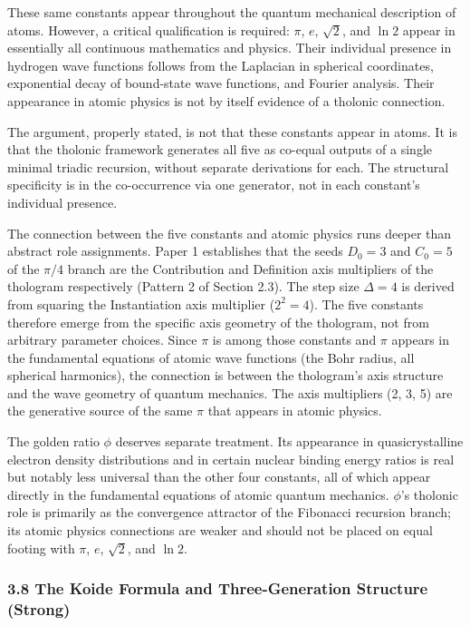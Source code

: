 \documentclass[
  11pt,
  letterpaper,
]{article}
\begin{document}
These same constants appear throughout the quantum mechanical
description of atoms. However, a critical qualification is required:
\(\pi\), \(e\), \(\sqrt{2}\), and \(\ln 2\) appear in essentially all
continuous mathematics and physics. Their individual presence in
hydrogen wave functions follows from the Laplacian in spherical
coordinates, exponential decay of bound-state wave functions, and
Fourier analysis. Their appearance in atomic physics is not by itself
evidence of a tholonic connection.

The argument, properly stated, is not that these constants appear in
atoms. It is that the tholonic framework generates all five as co-equal
outputs of a single minimal triadic recursion, without separate
derivations for each. The structural specificity is in the co-occurrence
via one generator, not in each constant's individual presence.

The connection between the five constants and atomic physics runs deeper
than abstract role assignments. Paper 1 establishes that the seeds
\(D_0 = 3\) and \(C_0 = 5\) of the \(\pi/4\) branch are the Contribution
and Definition axis multipliers of the thologram respectively (Pattern 2
of Section 2.3). The step size \(\Delta = 4\) is derived from squaring
the Instantiation axis multiplier (\(2^2 = 4\)). The five constants
therefore emerge from the specific axis geometry of the thologram, not
from arbitrary parameter choices. Since \(\pi\) is among those constants
and \(\pi\) appears in the fundamental equations of atomic wave
functions (the Bohr radius, all spherical harmonics), the connection is
between the thologram's axis structure and the wave geometry of quantum
mechanics. The axis multipliers (2, 3, 5) are the generative source of
the same \(\pi\) that appears in atomic physics.

The golden ratio \(\phi\) deserves separate treatment. Its appearance in
quasicrystalline electron density distributions and in certain nuclear
binding energy ratios is real but notably less universal than the other
four constants, all of which appear directly in the fundamental
equations of atomic quantum mechanics. \(\phi\)'s tholonic role is
primarily as the convergence attractor of the Fibonacci recursion
branch; its atomic physics connections are weaker and should not be
placed on equal footing with \(\pi\), \(e\), \(\sqrt{2}\), and
\(\ln 2\).

\subsubsection{3.8 The Koide Formula and Three-Generation Structure
(Strong)}\label{the-koide-formula-and-three-generation-structure-strong}
\end{document}
